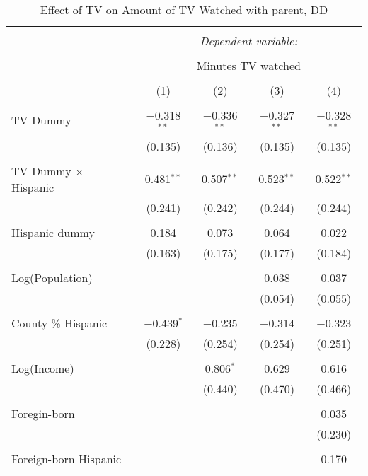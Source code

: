 
\begin{table}[!htbp] \centering 
  \caption{Effect of TV on Amount of TV Watched with parent, DD} 
  \label{} 
\begin{tabular}{@{\extracolsep{-5pt}}lcccc} 
\\[-1.8ex]\hline 
\hline \\[-1.8ex] 
 & \multicolumn{4}{c}{\textit{Dependent variable:}} \\ 
\cline{2-5} 
\\[-1.8ex] & \multicolumn{4}{c}{Minutes TV watched} \\ 
\\[-1.8ex] & (1) & (2) & (3) & (4)\\ 
\hline \\[-1.8ex] 
 TV Dummy & $-$0.318$^{**}$ & $-$0.336$^{**}$ & $-$0.327$^{**}$ & $-$0.328$^{**}$ \\ 
  & (0.135) & (0.136) & (0.135) & (0.135) \\ 
  & & & & \\ 
 TV Dummy $\times$ Hispanic  & 0.481$^{**}$ & 0.507$^{**}$ & 0.523$^{**}$ & 0.522$^{**}$ \\ 
  & (0.241) & (0.242) & (0.244) & (0.244) \\ 
  & & & & \\ 
 Hispanic dummy & 0.184 & 0.073 & 0.064 & 0.022 \\ 
  & (0.163) & (0.175) & (0.177) & (0.184) \\ 
  & & & & \\ 
 Log(Population) &  &  & 0.038 & 0.037 \\ 
  &  &  & (0.054) & (0.055) \\ 
  & & & & \\ 
 County \% Hispanic & $-$0.439$^{*}$ & $-$0.235 & $-$0.314 & $-$0.323 \\ 
  & (0.228) & (0.254) & (0.254) & (0.251) \\ 
  & & & & \\ 
 Log(Income) &  & 0.806$^{*}$ & 0.629 & 0.616 \\ 
  &  & (0.440) & (0.470) & (0.466) \\ 
  & & & & \\ 
 Foregin-born &  &  &  & 0.035 \\ 
  &  &  &  & (0.230) \\ 
  & & & & \\ 
 Foreign-born Hispanic &  &  &  & 0.170 \\ 

\end{tabular}
\end{table}
